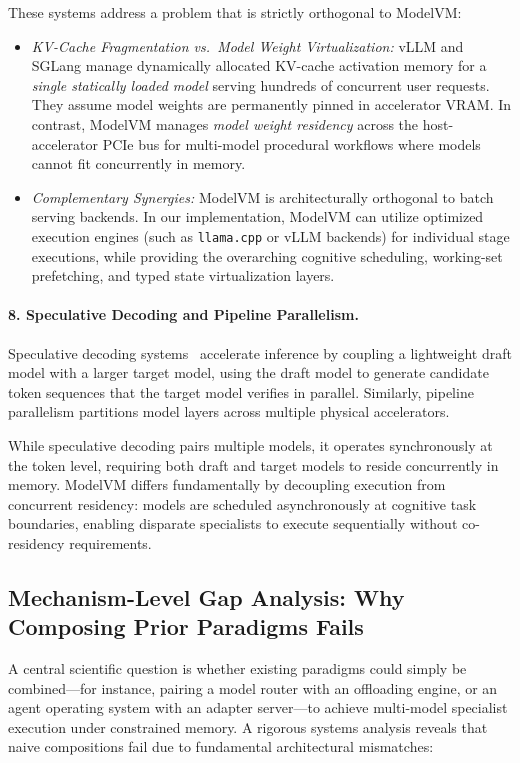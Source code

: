 These systems address a problem that is strictly orthogonal to ModelVM:
\begin{itemize}
    \item \textit{KV-Cache Fragmentation vs.\ Model Weight Virtualization:} vLLM and SGLang manage dynamically allocated KV-cache activation memory for a \textit{single statically loaded model} serving hundreds of concurrent user requests. They assume model weights are permanently pinned in accelerator VRAM. In contrast, ModelVM manages \textit{model weight residency} across the host-accelerator PCIe bus for multi-model procedural workflows where models cannot fit concurrently in memory.
    \item \textit{Complementary Synergies:} ModelVM is architecturally orthogonal to batch serving backends. In our implementation, ModelVM can utilize optimized execution engines (such as \texttt{llama.cpp} or vLLM backends) for individual stage executions, while providing the overarching cognitive scheduling, working-set prefetching, and typed state virtualization layers.
\end{itemize}

\paragraph{8. Speculative Decoding and Pipeline Parallelism.}
Speculative decoding systems~\cite{leviathan2023fast} accelerate inference by coupling a lightweight draft model with a larger target model, using the draft model to generate candidate token sequences that the target model verifies in parallel. Similarly, pipeline parallelism partitions model layers across multiple physical accelerators. 

While speculative decoding pairs multiple models, it operates synchronously at the token level, requiring both draft and target models to reside concurrently in memory. ModelVM differs fundamentally by decoupling execution from concurrent residency: models are scheduled asynchronously at cognitive task boundaries, enabling disparate specialists to execute sequentially without co-residency requirements.

\subsection{Mechanism-Level Gap Analysis: Why Composing Prior Paradigms Fails}
\label{sec:gap_analysis}

A central scientific question is whether existing paradigms could simply be combined---for instance, pairing a model router with an offloading engine, or an agent operating system with an adapter server---to achieve multi-model specialist execution under constrained memory. A rigorous systems analysis reveals that naive compositions fail due to fundamental architectural mismatches:

